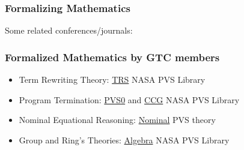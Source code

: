 \documentclass[10pt]{beamer}
\begin{document}
\begin{frame}\frametitle{Formalizing Mathematics}
Some related conferences/journals:

\vspace{1cm}

   \hspace{5mm}   \hspace{5mm}   \hspace{5mm}   \hspace{5mm} 

\end{frame}


\begin{frame}[fragile]
\frametitle{Formalized Mathematics by GTC members}

\begin{itemize}
\item {\color{brown}Term Rewriting Theory}: 
  \href{https://github.com/nasa/pvslib/tree/master/TRS}{\color{blue}TRS}
  NASA PVS Library

\item {\color{brown}Program Termination}:
  \href{https://github.com/nasa/pvslib/tree/master/PVS0}{\color{blue}
    PVS0} and \href{https://github.com/nasa/pvslib/tree/master/CCG}{\color{blue} CCG}  NASA PVS Library

\item {\color{brown}Nominal Equational Reasoning}:
  \href{http://nominal.cic.unb.br}{\color{blue}Nominal} PVS theory

\item {\color{brown} Group and Ring's Theories}:
  \href{https://github.com/nasa/pvslib/tree/master/algebra}{\color{blue}Algebra}  NASA PVS Library

\end{itemize}

\end{frame}
\end{document}
